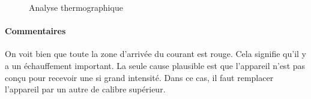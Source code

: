 \begin{figure}[ht]
\centering
{}
\caption{Analyse thermographique}
\label{fig:analyse_thermo}
\end{figure}
\pagebreak
\paragraph{Commentaires}
On voit bien  que toute la zone d'arrivée du courant est rouge. Cela signifie qu'il y a un échauffement important. La seule cause plausible est que l'appareil n'est pas conçu pour recevoir  une si grand intensité. Dans ce cas, il faut remplacer l'appareil par un autre de calibre supérieur.
